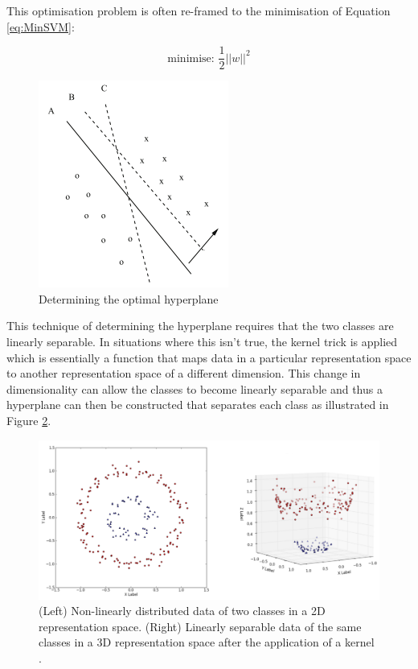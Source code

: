 \documentclass[a4paper,twoside,phd]{BYUPhys}
\begin{document}
This optimisation problem is often re-framed to the minimisation of Equation \ref{eq:MinSVM}:

\begin{equation}
\text{minimise: } \frac{1}{2}||w||^2
\label{eq:MinSVM}
\end{equation}


\begin{figure}[H]
	\centering
	\includegraphics[totalheight=7cm]{images/svm-example.png}
	\caption{Determining the optimal hyperplane \cite{Aggarwal2012}}
	\label{fig:SVMExample}
\end{figure}

This technique of determining the hyperplane requires that the two classes are linearly separable. In situations where this isn't true, the kernel trick \cite{aizerman67theoretical} is applied which is essentially a function that maps data in a particular representation space to another representation space of a different dimension. This change in dimensionality can allow the classes to become linearly separable and thus a hyperplane can then be constructed that separates each class as illustrated in Figure \ref{fig:KernelTrick}.

\begin{figure}[H]
	\centering
	\includegraphics[totalheight=7cm]{images/kernel-trick.png}
	\caption{(Left) Non-linearly distributed data of two classes in a 2D representation space. \newline
		(Right) Linearly separable data of the same classes in a 3D representation space after the application of a kernel \cite{UnderstandingKernel}.}
	\label{fig:KernelTrick}
\end{figure}
\end{document}

